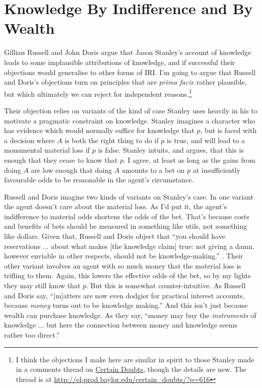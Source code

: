 \documentclass[oneside]{book}
\begin{document}
\section{Knowledge By Indifference and By Wealth}

Gillian Russell and John Doris \citeyearpar{RussellDoris2008} argue that Jason Stanley's account of knowledge leads to some implausible attributions of knowledge, and if successful their objections would generalise to other forms of IRI. I'm going to argue that Russell and Doris's objections turn on principles that are \textit{prima facie} rather plausible, but which ultimately we can reject for independent reasons.\footnote{I think the objections I make here are similar in spirit to those Stanley made in a comments thread on \href{http://el-prod.baylor.edu/certain_doubts/?p=616}{Certain Doubts}, though the details are new. The thread is at \href{http://el-prod.baylor.edu/certain_doubts/?p=616}{http://el-prod.baylor.edu/certain\_doubts/?p=616}}

Their objection relies on variants of the kind of case Stanley uses heavily in his \citeyearpar{Stanley2005-STAKAP} to motivate a pragmatic constraint on knowledge. Stanley imagines a character who has evidence which would normally suffice for knowledge that \(p\), but is faced with a decision where \(A\) is both the right thing to do if \(p\) is true, and will lead to a monumental material loss if \(p\) is false. Stanley intuits, and argues, that this is enough that they cease to know that \(p\). I agree, at least as long as the gains from doing \(A\) are low enough that doing \(A\) amounts to a bet on \(p\) at insufficiently favourable odds to be reasonable in the agent's circumstance.

Russell and Doris imagine two kinds of variants on Stanley's case. In one variant the agent doesn't care about the material loss. As I'd put it, the agent's indifference to material odds shortens the odds of the bet. That's because costs and benefits of bets should be measured in something like utils, not something like dollars. Given that, Russell and Doris object that ``you should have reservations ... about what makes [the knowledge claim] true: not giving a damn, however enviable in other respects, should not be knowledge-making.'' \citep[432]{RussellDoris2008}. Their other variant involves an agent with so much money that the material loss is trifling to them. Again, this lowers the effective odds of the bet, so by my lights they may still know that \(p\). But this is somewhat counter-intuitive. As Russell and Doris say, ``[m]atters are now even dodgier for practical interest accounts, because \textit{money} turns out to be knowledge making.'' \citep[433]{RussellDoris2008} And this isn't just because wealth can purchase knowledge. As they say, ``money may buy the \textit{instruments} of knowledge ... but here the connection between money and knowledge seems rather too direct.'' \citep[433]{RussellDoris2008}
\end{document}
